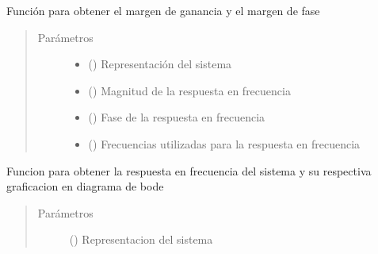 \documentclass[letterpaper,10pt,spanish]{sphinxmanual}
\begin{document}
\begin{fulllineitems}
\label{\detokenize{codigos/rutinas_analisis:rutinas_analisis.margenes_ganancias}}
Función para obtener el margen de ganancia y el margen de fase
\begin{quote}\begin{description}
\item[{Parámetros}] \leavevmode\begin{itemize}
\item {} 
 () \textendash{} Representación del sistema

\item {} 
 () \textendash{} Magnitud de la respuesta en frecuencia

\item {} 
 () \textendash{} Fase de la respuesta en frecuencia

\item {} 
 () \textendash{} Frecuencias utilizadas para la respuesta en frecuencia

\end{itemize}

\end{description}\end{quote}

\end{fulllineitems}


\begin{fulllineitems}
\label{\detokenize{codigos/rutinas_analisis:rutinas_analisis.rutina_bode_plot}}
Funcion para obtener la respuesta en frecuencia del sistema y su respectiva graficacion en diagrama de bode
\begin{quote}\begin{description}
\item[{Parámetros}] \leavevmode
{} () \textendash{} Representacion del sistema

\end{description}\end{quote}

\end{fulllineitems}
\end{document}
